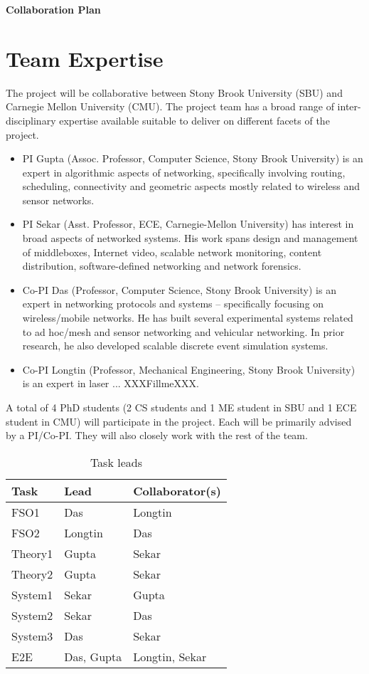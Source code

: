 \documentclass[11pt]{article}
\newcommand{\plsfill}{{\color{red}XXXFillmeXXX}}
\begin{document}
\centerline{\LARGE\bf Collaboration Plan}
\bigskip

\section{Team Expertise}
The project will be collaborative between Stony Brook University (SBU)
and Carnegie Mellon University (CMU). 
The project team has a broad range of  inter-disciplinary expertise available 
suitable to deliver on different facets of the project.
\begin{itemize}

\item PI Gupta (Assoc. Professor, Computer Science, Stony Brook University)  is
an expert in algorithmic aspects of networking, specifically involving routing,
scheduling, connectivity and geometric aspects mostly related to wireless and
sensor networks. 

\item PI Sekar (Asst. Professor, ECE, Carnegie-Mellon University) has interest
in broad aspects of networked systems. His work spans design and management of
middleboxes, Internet video, scalable network monitoring, content distribution,
software-defined networking and network forensics.  

\item Co-PI Das (Professor, Computer Science, Stony Brook University) is an
expert in networking protocols and systems – specifically focusing on
wireless/mobile networks. He has built several experimental systems related to
ad hoc/mesh and sensor networking and vehicular networking. In prior research,
he also developed scalable discrete event simulation  systems.  

\item Co-PI Longtin (Professor, Mechanical Engineering, Stony Brook University)
is an expert in laser ...  \plsfill.

\end{itemize}

A total of 4 PhD students (2 CS students and 1 ME student in SBU and 1 ECE student
in CMU) will participate in the project. Each will be primarily advised by a
PI/Co-PI.  They will also closely work with the rest of the team. 

\begin{wraptable}{r}{0.5\textwidth}
\begin{small}
\begin{tabular}{p{2cm}|p{2cm}|p{3cm}}
Task	& 	 Lead	&  Collaborator(s) \\ \hline
FSO1	& 	Das		& Longtin \\  
FSO2	& 	Longtin		& Das \\ 	
Theory1	&	Gupta		& Sekar \\
Theory2	& 	Gupta		& Sekar \\
System1	&	Sekar		& Gupta \\
System2	&	Sekar		& Das \\ 
System3	&	Das		& Sekar \\
E2E	&	Das, Gupta	& Longtin, Sekar 
\end{tabular}
\end{small}
\caption{Task leads}
\label{table:tasklead}
\end{wraptable}
\end{document}
